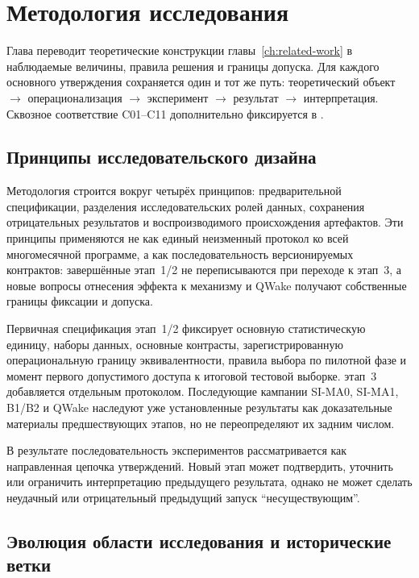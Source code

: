 \chapter{Методология исследования}
\label{chap:methodology}

Глава переводит теоретические конструкции главы~\ref{ch:related-work} в
наблюдаемые величины, правила решения и границы допуска. Для каждого основного
утверждения сохраняется один и тот же путь: теоретический объект $\rightarrow$
операционализация $\rightarrow$ эксперимент $\rightarrow$ результат
$\rightarrow$ интерпретация. Сквозное соответствие C01--C11 дополнительно
фиксируется в .

\section{Принципы исследовательского дизайна}

Методология строится вокруг четырёх принципов: предварительной спецификации,
разделения исследовательских ролей данных, сохранения отрицательных результатов
и воспроизводимого происхождения артефактов. Эти принципы применяются не как
единый неизменный протокол ко всей многомесячной программе, а как
последовательность версионируемых контрактов: завершённые этап~1/2 не
переписываются при переходе к этап~3, а новые вопросы отнесения эффекта к
механизму и QWake получают собственные границы фиксации и допуска.

Первичная спецификация этап~1/2 фиксирует основную статистическую единицу,
наборы данных, основные контрасты, зарегистрированную операциональную границу
эквивалентности, правила выбора по пилотной фазе и момент первого допустимого
доступа к итоговой тестовой выборке. этап~3 добавляется отдельным протоколом.
Последующие кампании SI-MA0, SI-MA1, B1/B2 и QWake наследуют уже установленные
результаты как доказательные материалы предшествующих этапов, но не
переопределяют их задним числом.

В результате последовательность экспериментов рассматривается как направленная
цепочка утверждений. Новый этап может подтвердить, уточнить или ограничить
интерпретацию предыдущего результата, однако не может сделать неудачный или
отрицательный предыдущий запуск ``несуществующим''.

\section{Эволюция области исследования и исторические ветки}
\label{sec:method-scope-evolution}

